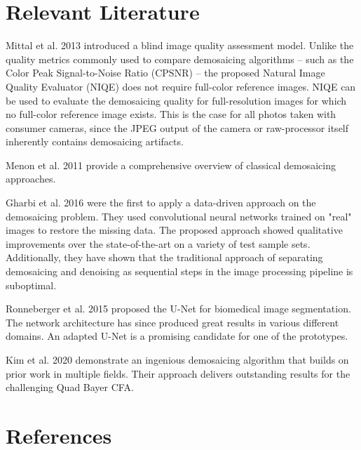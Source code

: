 \documentclass[english,notitlepage,smartquotes]{hgbreport}
\begin{document}
\section{Relevant Literature}

Mittal et al. 2013 \cite{Mittal2013} introduced a blind image quality assessment model. Unlike the quality metrics commonly used to compare demosaicing algorithms -- such as the Color Peak Signal-to-Noise Ratio (CPSNR) \cite{Menon2011} -- the proposed Natural Image Quality Evaluator (NIQE) does not require full-color reference images. NIQE can be used to evaluate the demosaicing quality for full-resolution images for which no full-color reference image exists. This is the case for all photos taken with consumer cameras, since the JPEG output of the camera or raw-processor itself inherently contains demosaicing artifacts.

Menon et al. 2011 \cite{Menon2011} provide a comprehensive overview of classical demosaicing approaches.

Gharbi et al. 2016 \cite{Gharbi2016} were the first to apply a data-driven approach on the demosaicing problem. They used convolutional neural networks trained on "real" images to restore the missing data. The proposed approach showed qualitative improvements over the state-of-the-art on a variety of test sample sets. Additionally, they have shown that the traditional approach of separating demosaicing and denoising as sequential steps in the image processing pipeline is suboptimal.

Ronneberger et al. 2015 \cite{Ronneberger2015} proposed the U-Net for biomedical image segmentation. The network architecture has since produced great results in various different domains. An adapted U-Net is a promising candidate for one of the prototypes.

Kim et al. 2020 \cite{Kim2020} demonstrate an ingenious demosaicing algorithm that builds on prior work in multiple fields. Their approach delivers outstanding results for the challenging Quad Bayer CFA.

  
\section*{References}

\printbibliography[heading=noheader]

\end{document}
